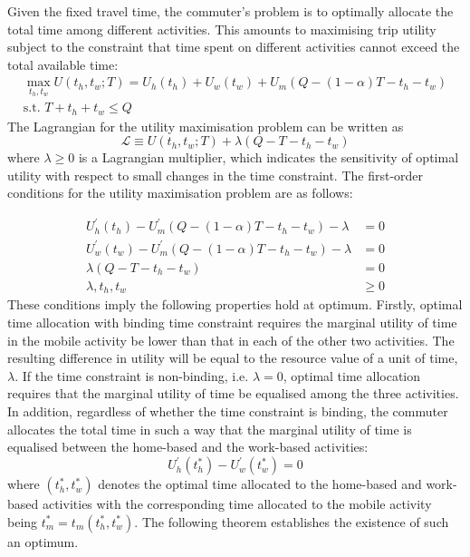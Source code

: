 \documentclass[12pt,a4paper,british]{article}
\begin{document}
Given the fixed travel time, the commuter's problem is to optimally allocate the total time among different activities. This amounts to maximising trip utility subject to the constraint that time spent on different activities cannot exceed the total available time:
\begin{gather*}
\max_{t_{h},t_{w}}U\left(t_{h},t_{w};T\right)=U_{h}\left(t_{h}\right)+U_{w}\left(t_{w}\right)+U_{m}\left(Q-\left(1-\alpha\right)T-t_{h}-t_{w}\right)\\
\mbox{s.t. }T+t_{h}+t_{w}\leq Q
\end{gather*}
 The Lagrangian for the utility maximisation problem can be written as
\begin{equation*}
\mathcal{L}\equiv U\left(t_{h},t_{w};T\right)+\lambda\left(Q-T-t_{h}-t_{w}\right)
\end{equation*}%
where $\lambda\geq0$ is a Lagrangian multiplier, which indicates the sensitivity of optimal utility with respect to small changes in the time constraint. The first-order conditions for the utility maximisation problem are as follows:

\begin{equation}
\begin{aligned}
U_{h}^{\prime}\left(t_{h}\right)-U_{m}^{\prime}\left(Q-\left(1-\alpha\right)T-t_{h}-t_{w}\right)-\lambda & =0\\
U_{w}^{\prime}\left(t_{w}\right)-U_{m}^{\prime}\left(Q-\left(1-\alpha\right)T-t_{h}-t_{w}\right)-\lambda & =0\\
\lambda\left(Q-T-t_{h}-t_{w}\right) & =0\\
\lambda,t_{h},t_{w} & \geq0
\end{aligned}
\label{eq:foc_deterministic}
\end{equation}
These conditions imply the following properties hold at optimum. Firstly, optimal time allocation with binding time constraint requires the marginal utility of time in the mobile activity be lower than that in each of the other two activities. The resulting difference in utility will be equal to the resource value of a unit of time, $\lambda$. If the time constraint is non-binding, i.e. $\lambda=0$, optimal time allocation requires that the marginal utility of time be equalised among the three activities. In addition, regardless of whether the time constraint is binding, the commuter allocates the total time in such a way that the marginal utility of time is equalised between the home-based and the work-based activities:%
\begin{equation}
U_{h}^{\prime}\left(t_{h}^{\ast}\right)-U_{w}^{\prime}\left(t_{w}^{\ast}\right)=0\label{eq:Uh_eq_Uw}
\end{equation}%
where $\left(t_{h}^{\ast},t_{w}^{\ast}\right)$ denotes the optimal time allocated to the home-based and work-based activities with the corresponding time allocated to the mobile activity being $t_{m}^{\ast}=t_{m}\left(t_{h}^{\ast},t_{w}^{\ast}\right)$. The following theorem establishes the existence of such an optimum.
\end{document}
